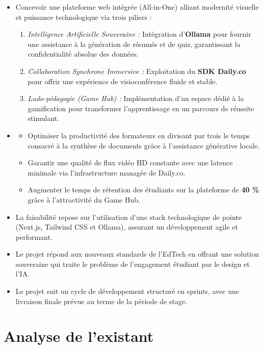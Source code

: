 \begin{itemize}
    \item Concevoir une plateforme web intégrée (All-in-One) alliant modernité visuelle et puissance technologique via trois piliers :
    \begin{enumerate}
        \item \textit{Intelligence Artificielle Souveraine :} Intégration d'\textbf{Ollama} pour fournir une assistance à la génération de résumés et de quiz, garantissant la confidentialité absolue des données.
        \item \textit{Collaboration Synchrone Immersive :} Exploitation du \textbf{SDK Daily.co} pour offrir une expérience de visioconférence fluide et stable.
        \item \textit{Ludo-pédagogie (Game Hub) :} Implémentation d'un espace dédié à la gamification pour transformer l'apprentissage en un parcours de réussite stimulant.
    \end{enumerate}

    \item 
    \begin{itemize}
        \item Optimiser la productivité des formateurs en divisant par trois le temps consacré à la synthèse de documents grâce à l'assistance générative locale.
        \item Garantir une qualité de flux vidéo HD constante avec une latence minimale via l'infrastructure managée de Daily.co.
        \item Augmenter le temps de rétention des étudiants sur la plateforme de \textbf{40 \%} grâce à l'attractivité du Game Hub.
    \end{itemize}

    \item La faisabilité repose sur l'utilisation d'une stack technologique de pointe (Next.js, Tailwind CSS et Ollama), assurant un développement agile et performant.

    \item Le projet répond aux nouveaux standards de l'EdTech en offrant une solution souveraine qui traite le problème de l'engagement étudiant par le design et l'IA.

    \item Le projet suit un cycle de développement structuré en sprints, avec une livraison finale prévue au terme de la période de stage.
\end{itemize}

\section{Analyse de l'existant}

